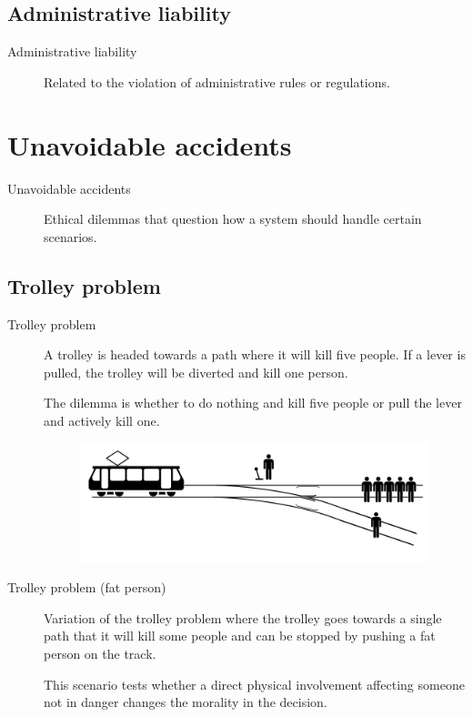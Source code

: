 \subsection{Administrative liability}

\begin{description}
    \item[Administrative liability] 
        Related to the violation of administrative rules or regulations.
\end{description}



\section{Unavoidable accidents}

\begin{description}
    \item[Unavoidable accidents]
        Ethical dilemmas that question how a system should handle certain scenarios.
\end{description}


\subsection{Trolley problem}

\begin{description}
    \item[Trolley problem] 
        A trolley is headed towards a path where it will kill five people. If a lever is pulled, the trolley will be diverted and kill one person.

        The dilemma is whether to do nothing and kill five people or pull the lever and actively kill one.

        \begin{figure}[H]
            \centering
            \includegraphics[width=0.5\linewidth]{./img/trolley_problem.png}
        \end{figure}

    \item[Trolley problem (fat person)] 
        Variation of the trolley problem where the trolley goes towards a single path that it will kill some people and can be stopped by pushing a fat person on the track.

        This scenario tests whether a direct physical involvement affecting someone not in danger changes the morality in the decision.
\end{description}


